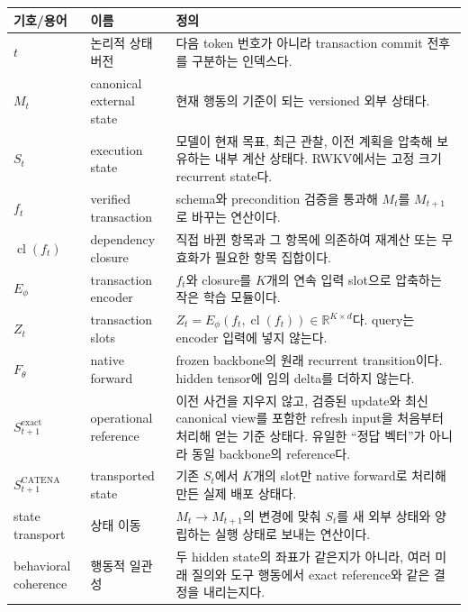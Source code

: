 \documentclass[10.5pt,a4paper]{article}
\begin{document}
\begin{longtable}{@{}L{33mm}L{45mm}p{82mm}@{}}
\toprule
기호/용어 & 이름 & 정의 \\
\midrule
\endhead
$t$ & 논리적 상태 버전 & 다음 token 번호가 아니라 transaction commit 전후를 구분하는 인덱스다. \\
$M_t$ & canonical external state & 현재 행동의 기준이 되는 versioned 외부 상태다. \\
$S_t$ & execution state & 모델이 현재 목표, 최근 관찰, 이전 계획을 압축해 보유하는 내부 계산 상태다. RWKV에서는 고정 크기 recurrent state다. \\
$f_t$ & verified transaction & schema와 precondition 검증을 통과해 $M_t$를 $M_{t+1}$로 바꾸는 연산이다. \\
$\operatorname{cl}(f_t)$ & dependency closure & 직접 바뀐 항목과 그 항목에 의존하여 재계산 또는 무효화가 필요한 항목 집합이다. \\
$E_\phi$ & transaction encoder & $f_t$와 closure를 $K$개의 연속 입력 slot으로 압축하는 작은 학습 모듈이다. \\
$Z_t$ & transaction slots & $Z_t=E_\phi(f_t,\operatorname{cl}(f_t))\in\mathbb{R}^{K\times d}$다. query는 encoder 입력에 넣지 않는다. \\
$F_\theta$ & native forward & frozen backbone의 원래 recurrent transition이다. hidden tensor에 임의 delta를 더하지 않는다. \\
$S_{t+1}^{\mathrm{exact}}$ & operational reference & 이전 사건을 지우지 않고, 검증된 update와 최신 canonical view를 포함한 refresh input을 처음부터 처리해 얻는 기준 상태다. 유일한 ``정답 벡터''가 아니라 동일 backbone의 reference다. \\
$S_{t+1}^{\mathrm{CATENA}}$ & transported state & 기존 $S_t$에서 $K$개의 slot만 native forward로 처리해 만든 실제 배포 상태다. \\
state transport & 상태 이동 & $M_t\to M_{t+1}$의 변경에 맞춰 $S_t$를 새 외부 상태와 양립하는 실행 상태로 보내는 연산이다. \\
behavioral coherence & 행동적 일관성 & 두 hidden state의 좌표가 같은지가 아니라, 여러 미래 질의와 도구 행동에서 exact reference와 같은 결정을 내리는지다. \\
\bottomrule
\end{longtable}
\end{document}
